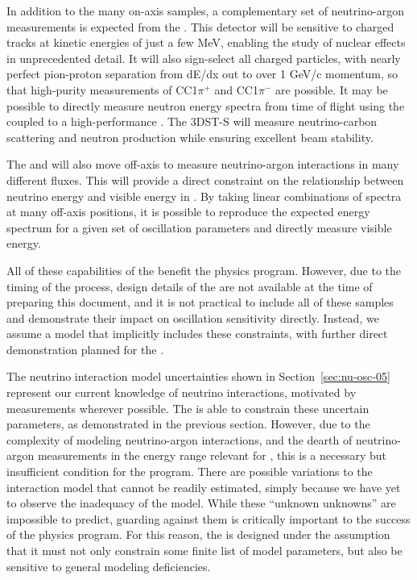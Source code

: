 In addition to the many on-axis  samples, a complementary set of neutrino-argon measurements is expected from the  . This detector will be sensitive to charged tracks at kinetic energies of just a few MeV, enabling the study of nuclear effects in unprecedented detail. It will also sign-select all charged particles, with nearly perfect pion-proton separation from dE/dx out to over 1 GeV/c momentum, so that high-purity measurements of CC1$\pi^{+}$ and CC1$\pi^{-}$ are possible. It may be possible to directly measure neutron energy spectra from time of flight using the   coupled to a high-performance . The 3DST-S will measure neutrino-carbon scattering and neutron production while ensuring excellent beam stability.

The  and  will also move off-axis to measure neutrino-argon interactions in many different fluxes. This will provide a direct constraint on the relationship between neutrino energy and visible energy in . By taking linear combinations of spectra at many off-axis positions, it is possible to reproduce the expected  energy spectrum for a given set of oscillation parameters and directly measure visible energy.

All of these capabilities of the  benefit the  physics program. However, due to the timing of the  process, design details of the  are not available at the time of preparing this document, and it is not practical to include all of these samples and demonstrate their impact on oscillation sensitivity directly. Instead, we assume a model that implicitly includes these constraints, with further direct demonstration planned for the  .

The neutrino interaction model uncertainties shown in Section~\ref{sec:nu-osc-05} represent our current knowledge of neutrino interactions, motivated by measurements wherever possible. The   is able to constrain these uncertain parameters, as demonstrated in the previous section. However, due to the complexity of modeling neutrino-argon interactions, and the dearth of neutrino-argon measurements in the energy range relevant for , this is a necessary but insufficient condition for the  program. There are possible variations to the interaction model that cannot be readily estimated, simply because we have yet to observe the inadequacy of the model. While these ``unknown unknowns'' are impossible to predict, guarding against them is critically important to the success of the  physics program. For this reason, the  is designed under the assumption that it must not only constrain some finite list of model parameters, but also be sensitive to general modeling deficiencies.

